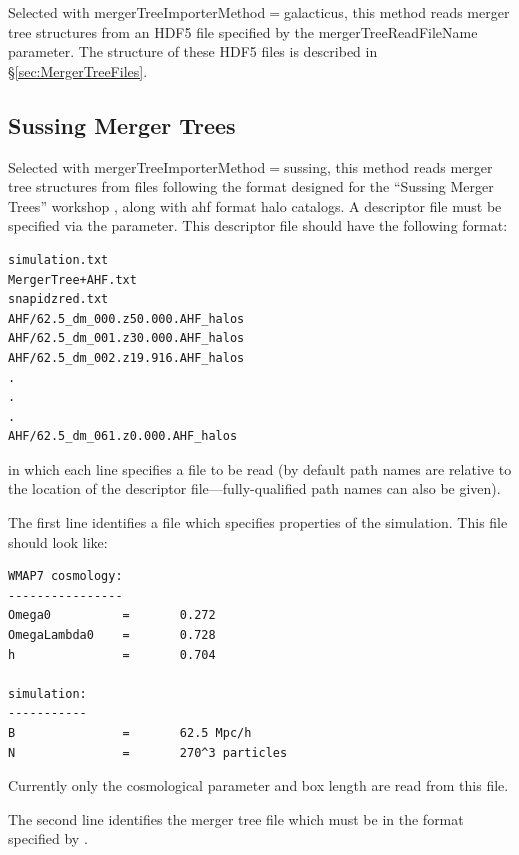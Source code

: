 Selected with {\normalfont \ttfamily mergerTreeImporterMethod}$=${\normalfont \ttfamily galacticus}, this method reads merger tree structures from an HDF5 file specified by the {\normalfont \ttfamily mergerTreeReadFileName} parameter. The structure of these HDF5 files is described in \S\ref{sec:MergerTreeFiles}.

\subsection{Sussing Merger Trees}\label{phys:mergerTreeImporter:mergerTreeImporterSussing}

Selected with {\normalfont \ttfamily mergerTreeImporterMethod}$=${\normalfont \ttfamily sussing}, this method reads merger tree structures from files following the format designed for the ``Sussing Merger Trees'' workshop \citep{srisawat_sussing_2013}, along with \gls{ahf} format halo catalogs. A descriptor file must be specified via the {\normalfont \ttfamily [mergerTreeReadFileName]} parameter. This descriptor file should have the following format:
\begin{verbatim}
simulation.txt
MergerTree+AHF.txt
snapidzred.txt
AHF/62.5_dm_000.z50.000.AHF_halos
AHF/62.5_dm_001.z30.000.AHF_halos
AHF/62.5_dm_002.z19.916.AHF_halos
.
.
.
AHF/62.5_dm_061.z0.000.AHF_halos
\end{verbatim}
in which each line specifies a file to be read (by default path names are relative to the location of the descriptor file---fully-qualified path names can also be given).

The first line identifies a file which specifies properties of the simulation. This file should look like:
\begin{verbatim}
WMAP7 cosmology:
----------------
Omega0          =       0.272
OmegaLambda0    =       0.728
h               =       0.704

simulation:
-----------
B               =       62.5 Mpc/h
N               =       270^3 particles
\end{verbatim}
Currently only the cosmological parameter and box length are read from this file.

The second line identifies the merger tree file which must be in the format specified by \cite{srisawat_sussing_2013}.

